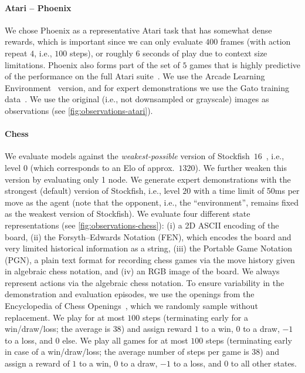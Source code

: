 \documentclass{article}
\newcommand{\ie}{i.e., }
\begin{document}
\paragraph{Atari -- Phoenix}
We chose Phoenix as a representative Atari task that has somewhat dense rewards, which is important since we can only evaluate $400$ frames (with action repeat $4$, \ie $100$ steps), or roughly $6$ seconds of play due to context size limitations.
Phoenix also forms part of the set of $5$ games that is highly predictive of the performance on the full Atari suite~\citep{aitchison2023atari}.
We use the Arcade Learning Environment~\citep{bellemare2013arcade} version, and for expert demonstrations we use the Gato training data~\citep{reed2022generalist}.
We use the original (\ie not downsampled or grayscale) images as observations (see \cref{fig:observations-atari}).
\paragraph{Chess}
We evaluate models against the \emph{weakest-possible} version of Stockfish~$16$~\citep{romstad2008stockfish}, \ie level $0$ (which corresponds to an Elo of approx.\ $1320$).
We further weaken this version by evaluating only 1 node.
We generate expert demonstrations with the strongest (default) version of Stockfish, \ie level $20$ with a time limit of 50ms per move as the agent (note that the opponent, \ie the ``environment'', remains fixed as the weakest version of Stockfish).
We evaluate four different state representations (see \cref{fig:observations-chess}): (i) a 2D ASCII encoding of the board, (ii) the Forsyth–Edwards Notation (FEN), which encodes the board and very limited historical information as a string, (iii) the Portable Game Notation (PGN), a plain text format for recording chess games via the move history given in algebraic chess notation, and (iv) an RGB image of the board.
We always represent actions via the algebraic chess notation.
To ensure variability in the demonstration and evaluation episodes, we use the openings from the Encyclopedia of Chess Openings~\citep{matanovic1978encyclopaedia}, which we randomly sample without replacement.
\ificlr
We play for at most $100$ steps (terminating early for a win/draw/loss; the average is $38$) and assign reward $1$ to a win, $0$ to a draw, $-1$ to a loss, and $0$ else.
\else
We play all games for at most $100$ steps (terminating early in case of a win/draw/loss; the average number of steps per game is $38$) and assign a reward of $1$ to a win, $0$ to a draw, $-1$ to a loss, and $0$ to all other states.
\fi
\end{document}
